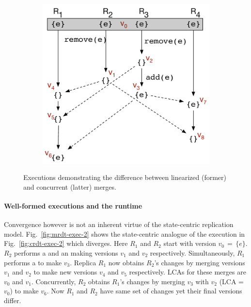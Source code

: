 \begin{figure}[ht]
\begin{subfigure}[t]{0.57\columnwidth}
    \includegraphics[scale=0.35]{Figures/mrdt-execs-4}
    \caption{}
    \label{fig:mrdt-exec-4}
  \end{subfigure}
  \caption{Executions demonstrating the difference between linearized
  (former) and concurrent (latter) merges.}
\label{fig:mrdt-execs-2}
\vspace*{-0.25in}
\end{figure}

\noindent\paragraph{Well-formed executions and the \quark runtime}
Convergence however is not an inherent virtue of the state-centric
replication model. Fig.~\ref{fig:mrdt-exec-2} shows the state-centric
analogue of the execution in Fig.~\ref{fig:crdt-exec-2} which
diverges. Here $R_1$ and $R_2$ start with version $v_0 \,=\, \{e\}$.
$R_2$ performs a  and an  making versions
$v_1$ and $v_2$ respectively. Simultaneously, $R_1$ performs a
 to make $v_3$. Replica $R_1$ now obtains $R_2$'s changes by
merging versions $v_1$ and $v_2$ to make new versions $v_4$ and $v_5$
respectively. LCAs for these merges are $v_0$ and $v_1$. Concurrently,
$R_2$ obtains $R_1$'s changes by merging $v_3$ with $v_2$ (LCA =
$v_0$) to make $v_6$.  Now $R_1$ and $R_2$ have same set of changes
yet their final versions differ.

